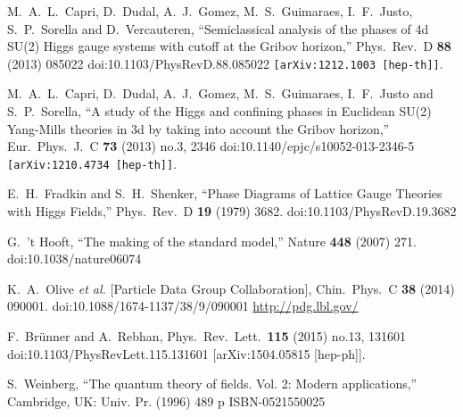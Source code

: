 \documentclass[a4paper,11pt,british,twosides]{book}%
\numberwithin{equation}{section}
\begin{document}
\begin{thebibliography}{9}
  M.~A.~L.~Capri, D.~Dudal, A.~J.~Gomez, M.~S.~Guimaraes, I.~F.~Justo, S.~P.~Sorella and
  D.~Vercauteren,
  ``Semiclassical analysis of the phases of 4d SU(2) Higgs gauge systems with cutoff at the
  Gribov horizon,''
  Phys.\ Rev.\ D {\bf 88} (2013) 085022
  doi:10.1103/PhysRevD.88.085022
  {\tt [arXiv:1212.1003 [hep-th]]}.

  M.~A.~L.~Capri, D.~Dudal, A.~J.~Gomez, M.~S.~Guimaraes, I.~F.~Justo and S.~P.~Sorella,
  ``A study of the Higgs and confining phases in Euclidean SU(2) Yang-Mills theories in 3d by
  taking into account the Gribov horizon,''
  Eur.\ Phys.\ J.\ C {\bf 73} (2013) no.3,  2346
  doi:10.1140/epjc/s10052-013-2346-5
  {\tt [arXiv:1210.4734 [hep-th]]}.

  E.~H.~Fradkin and S.~H.~Shenker,
  ``Phase Diagrams of Lattice Gauge Theories with Higgs Fields,''
  Phys.\ Rev.\ D {\bf 19} (1979) 3682.
  doi:10.1103/PhysRevD.19.3682

  G.~'t Hooft,
  ``The making of the standard model,''
  Nature {\bf 448} (2007) 271.
  doi:10.1038/nature06074

  K.~A.~Olive {\it et al.} [Particle Data Group Collaboration],
  Chin.\ Phys.\ C {\bf 38} (2014) 090001.
  doi:10.1088/1674-1137/38/9/090001
  \url{http://pdg.lbl.gov/}

  F.~Brünner and A.~Rebhan,
  Phys.\ Rev.\ Lett.\  {\bf 115} (2015) no.13,  131601
  doi:10.1103/PhysRevLett.115.131601
  [arXiv:1504.05815 [hep-ph]].

  S.~Weinberg,
  ``The quantum theory of fields. Vol. 2: Modern applications,''
  Cambridge, UK: Univ. Pr. (1996) 489 p
  ISBN-0521550025


\end{thebibliography}
\end{document}
